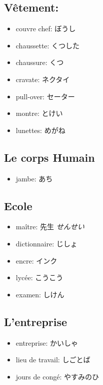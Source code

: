 \documentclass{article}
\begin{document}
\begin{CJK}{UTF8}{min}
   \subsection{Vêtement:}
   \begin{itemize}
       \item couvre chef: ぼうし
       \item chaussette: くつした
        \item chaussure: くつ
        \item cravate: ネクタイ
        \item pull-over: セーター
        \item montre: とけい
        \item lunettes: めがね
   \end{itemize}

   \subsection{Le corps Humain}
   \begin{itemize}
       \item jambe: あち
   \end{itemize}

    \subsection{Ecole}
   \begin{itemize}
       \item maître: 先生 \textit{せんせい}
       \item dictionnaire: じしょ
       \item encre: インク
       \item lycée: こうこう
        \item examen: しけん
   \end{itemize}

   \subsection{L'entreprise}
   \begin{itemize}
       \item entreprise: かいしゃ
        \item lieu de travail: しごとば
        \item jours de congé: やすみのひ
   \end{itemize}


\end{CJK}
\end{document}
